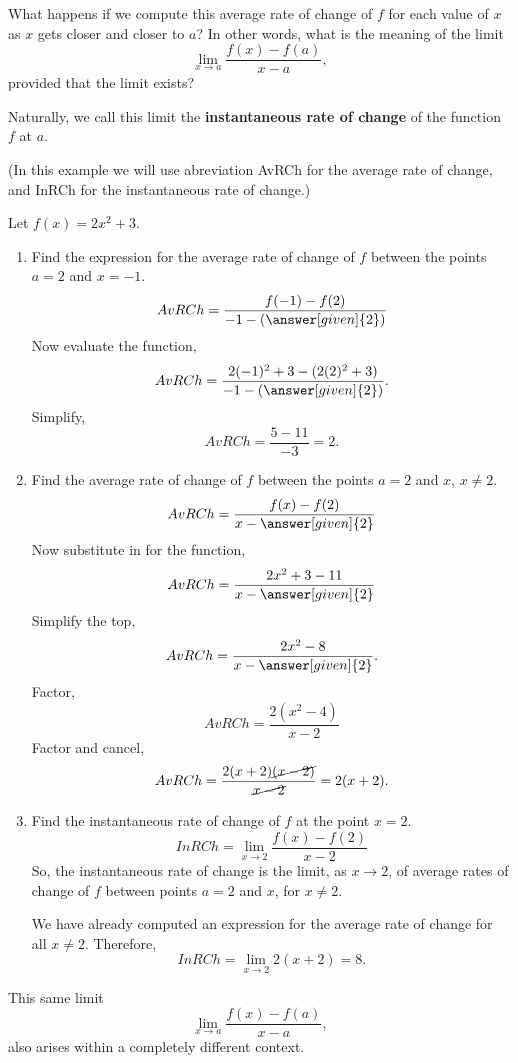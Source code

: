 \documentclass{ximera}
\begin{document}
What happens if we compute this average rate of change of $f$ for each value of $x$ as $x$ gets closer and closer to $a$? In other words, what is the meaning of the limit
\[ \lim_{x\to a} \frac{f(x)-f(a)}{x-a},\] 
provided that the limit exists?
    
Naturally, we call this limit the \textbf{instantaneous rate of change} of the function $f$ at $a$.
\begin{example}
	(In this example we will use abreviation AvRCh for the average rate of change,  and InRCh for the instantaneous rate of change.)
	
	Let $f(x)=2x^2+3$.
	\begin{enumerate}
	\item Find the expression for the average rate of change of $f$ between the points  $a=2$ and $x=-1$.
		\[ AvRCh=\frac{f(-1)-f(2)}{-1-\left(\answer[given]{2}\right)}\]
		  Now evaluate the function,
		 \[ AvRCh=\frac{2(-1)^2+3-(2(2)^2+3)}{-1-\left(\answer[given]{2}\right)}.\]
		Simplify, \[ AvRCh=\frac{5-11}{-3}=2. \]
		
	\item Find  the average rate of change of $f$ between the points $a=2$ and $x$, $x\ne 2$.
		\[ AvRCh=\frac{f(x)-f(2)}{x-\answer[given]{2}} \]
		 Now substitute in for the function, 
		 \[ AvRCh=\frac{2x^2+3-11}{x-\answer[given]{2}} \]
		Simplify the top,
		\[ AvRCh=\frac{2x^2-8}{x-\answer[given]{2}}. \]
		Factor,
		\[ AvRCh=\frac{2(x^2-4)}{x-2} \]
		Factor and cancel,
		\[ AvRCh=\frac{2(x+2)\cancel{(x-2)}}{\cancel{x-2}}=2(x+2). \]
		
	\item Find the instantaneous rate of change of $f$ at the point $x=2$.
		\[ InRCh= \lim_{x\to 2} \frac{f(x)-f(2)}{x-2} \]
		So, the instantaneous rate of change is the limit, as $x\to 2$, of average rates of change of $f$ 
		between points $a=2$ and $x$, for $x\ne2$. 
	
		We have already computed an expression for the average rate of change for all $x\ne2$. 
		Therefore, \[ InRCh=\lim_{x\to 2}2(x+2)=8.\]
	
	\end{enumerate}
\end{example}

This same limit
\[ \lim_{x\to a} \frac{f(x)-f(a)}{x-a},\] 
also arises within a completely different context.
\end{document}
